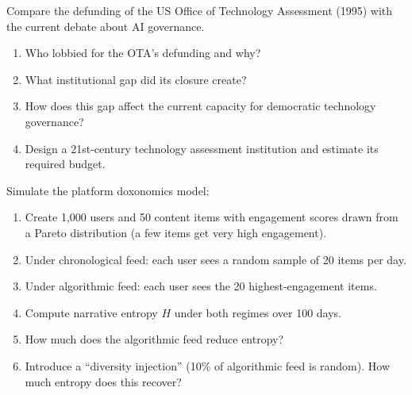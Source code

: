 \begin{exercise}
Compare the defunding of the US Office of Technology Assessment (1995) with the current debate about AI governance.
\begin{enumerate}[nosep]
  \item Who lobbied for the OTA's defunding and why?
  \item What institutional gap did its closure create?
  \item How does this gap affect the current capacity for democratic technology governance?
  \item Design a 21st-century technology assessment institution and estimate its required budget.
\end{enumerate}
\end{exercise}

\begin{exercise}[Computational]
Simulate the platform doxonomics model:
\begin{enumerate}[nosep]
  \item Create 1,000 users and 50 content items with engagement scores drawn from a Pareto distribution (a few items get very high engagement).
  \item Under chronological feed: each user sees a random sample of 20 items per day.
  \item Under algorithmic feed: each user sees the 20 highest-engagement items.
  \item Compute narrative entropy $H$ under both regimes over 100 days.
  \item How much does the algorithmic feed reduce entropy?
  \item Introduce a ``diversity injection'' (10\% of algorithmic feed is random). How much entropy does this recover?
\end{enumerate}
\end{exercise}
